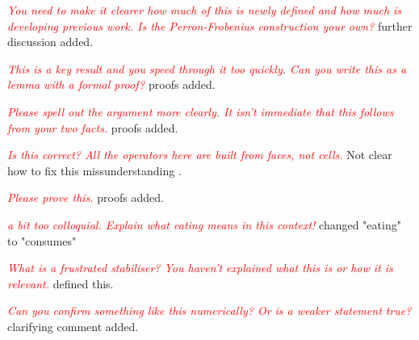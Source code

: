 \documentclass[11pt,oneside]{article}
\newcommand{\danbrowne}[1]{\vspace{10pt}\noindent\textcolor{red}{{\it #1}}}
\begin{document}
\danbrowne{You need to make it clearer how much of this is newly defined and how much is developing previous work. Is the Perron-Frobenius construction your own?}
further discussion added.


\danbrowne{This is a key result and you speed through it too quickly. Can you write this as a lemma with a formal proof?}
proofs added.


\danbrowne{Please spell out the argument more clearly. It isn't immediate that this follows from your two facts. }
proofs added.


\danbrowne{Is this correct? All the operators here are built from faces, not cells. }
Not clear how to fix this missunderstanding .


\danbrowne{Please prove this.}
proofs added.


\danbrowne{a bit too colloquial. Explain what eating means in this context!}
changed "eating" to "consumes"


\danbrowne{What is a frustrated stabiliser? You haven't explained what this is or how it is relevant.}
defined this.


\danbrowne{Can you confirm something like this numerically? Or is a weaker statement true?}
clarifying comment added.
\end{document}
